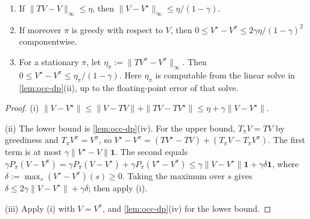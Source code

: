 \begin{lemma}\label{lem:occ-residual}
\leavevmode
\begin{enumerate}[nosep,label=(\roman*)]
\item If $\|TV-V\|_\infty\le\eta$, then $\|V-V^\star\|_\infty\le\eta/(1-\gamma)$.
\item If moreover $\pi$ is greedy with respect to $V$, then $0\le V^\star-V^\pi\le 2\gamma\eta/(1-\gamma)^2$ componentwise.
\item For a stationary $\pi$, let $\eta_\pi:=\|TV^\pi-V^\pi\|_\infty$. Then $0\le V^\star-V^\pi\le\eta_\pi/(1-\gamma)$.
  Here $\eta_\pi$ is computable from the linear solve in \cref{lem:occ-dp}(ii), up to the floating-point error of that solve.
\end{enumerate}
\end{lemma}
\begin{proof}
(i) $\|V-V^\star\|\le\|V-TV\|+\|TV-TV^\star\|\le\eta+\gamma\|V-V^\star\|$.

(ii) The lower bound is \cref{lem:occ-dp}(iv). For the upper bound, $T_\pi V=TV$ by greediness and $T_\pi V^\pi=V^\pi$, so
$V^\star-V^\pi=(TV^\star-TV)+(T_\pi V-T_\pi V^\pi)$.
The first term is at most $\gamma\|V^\star-V\|\mathbf1$.
The second equals $\gamma P_\pi(V-V^\pi)=\gamma P_\pi(V-V^\star)+\gamma P_\pi(V^\star-V^\pi)\le\gamma\|V-V^\star\|\mathbf1+\gamma\delta\mathbf1$, where $\delta:=\max_s(V^\star-V^\pi)(s)\ge0$.
Taking the maximum over $s$ gives $\delta\le2\gamma\|V-V^\star\|+\gamma\delta$; then apply (i).

(iii) Apply (i) with $V=V^\pi$, and \cref{lem:occ-dp}(iv) for the lower bound.
\end{proof}

